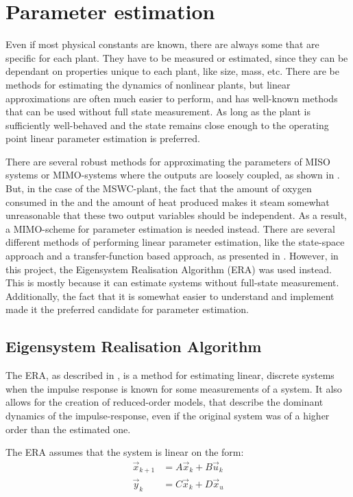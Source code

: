 \chapter{Parameter estimation}
\label{sec:ERA}

Even if most physical constants are known, there are always some that are specific for each plant. They have to be measured or estimated, since they can be dependant on properties unique to each plant, like size, mass, etc. There are be methods for estimating the dynamics of nonlinear plants, but linear approximations are often much easier to perform, and has well-known methods that can be used without full state measurement. As long as the plant is sufficiently well-behaved and the state remains close enough to the operating point linear parameter estimation is preferred. 

\noindent
There are several robust methods for approximating the parameters of MISO systems or MIMO-systems where the outputs are loosely coupled, as shown in \cite{Adaptiv_boken}. But, in the case of the MSWC-plant, the fact that the amount of oxygen consumed in the and the amount of heat produced makes it steam somewhat unreasonable that these two output variables should be independent. As a result, a MIMO-scheme for parameter estimation is needed instead. There are several different methods of performing linear parameter estimation, like the state-space approach and a transfer-function based approach, as presented in \cite{MIMO_estimation}. However, in this project, the Eigensystem Realisation Algorithm (ERA) was used instead. This is mostly because it can estimate systems without full-state measurement. Additionally, the fact that it is somewhat easier to understand and implement made it the preferred candidate for parameter estimation. 


\section{Eigensystem Realisation Algorithm}
The ERA, as described in \cite{ERA_source}, is a method for estimating linear, discrete systems when the impulse response is known for some measurements of a system.  It also allows for the creation of reduced-order models, that describe the dominant dynamics of the impulse-response, even if the original system was of a higher order than the estimated one. 

The ERA assumes that the system is linear on the form:
\begin{align}
    \vec{x}_{k+1} &= A \vec{x}_k + B \vec{u}_k  \\
    \vec{y}_k &= C \vec{x}_k + D \vec{x}_u
\end{align}

